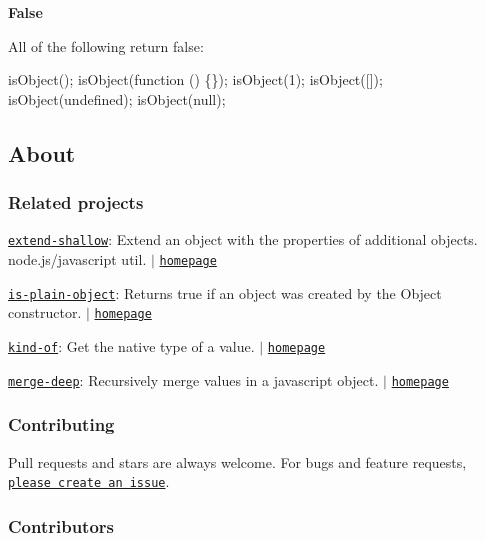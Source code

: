 {\bfseries False}

All of the following return {\ttfamily false}\+:


\begin{DoxyCode}
isObject();
isObject(function () \{\});
isObject(1);
isObject([]);
isObject(undefined);
isObject(null);
\end{DoxyCode}


\subsection*{About}

\subsubsection*{Related projects}


\begin{DoxyItemize}
\item \href{https://www.npmjs.com/package/extend-shallow}{\tt extend-\/shallow}\+: Extend an object with the properties of additional objects. node.\+js/javascript util. $\vert$ \href{https://github.com/jonschlinkert/extend-shallow}{\tt homepage}
\item \href{https://www.npmjs.com/package/is-plain-object}{\tt is-\/plain-\/object}\+: Returns true if an object was created by the {\ttfamily Object} constructor. $\vert$ \href{https://github.com/jonschlinkert/is-plain-object}{\tt homepage}
\item \href{https://www.npmjs.com/package/kind-of}{\tt kind-\/of}\+: Get the native type of a value. $\vert$ \href{https://github.com/jonschlinkert/kind-of}{\tt homepage}
\item \href{https://www.npmjs.com/package/merge-deep}{\tt merge-\/deep}\+: Recursively merge values in a javascript object. $\vert$ \href{https://github.com/jonschlinkert/merge-deep}{\tt homepage}
\end{DoxyItemize}

\subsubsection*{Contributing}

Pull requests and stars are always welcome. For bugs and feature requests, \href{../../issues/new}{\tt please create an issue}.

\subsubsection*{Contributors}

